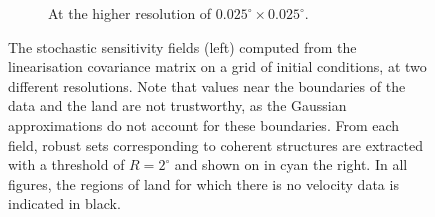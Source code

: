 \begin{figure}
\begin{subfigure}{\textwidth}
		\caption{At the higher resolution of \(0.025^\circ \times 0.025^\circ\).}
		\label{fig:na_s2_grid}
	\end{subfigure}
	\caption{The stochastic sensitivity fields (left) computed from the linearisation covariance matrix on a grid of initial conditions, at two different resolutions.
		Note that values near the boundaries of the data and the land are not trustworthy, as the Gaussian approximations do not account for these boundaries.
		From each field, robust sets corresponding to coherent structures are extracted with a threshold of \(R = 2^\circ\) and shown on in cyan the right.
		In all figures, the regions of land for which there is no velocity data is indicated in black.}
	\label{fig:na_s2}
\end{figure}






